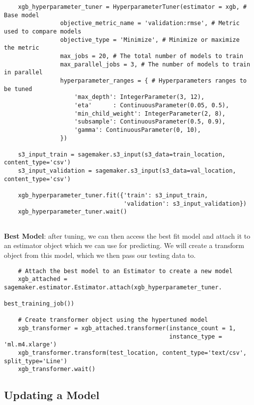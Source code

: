 \documentclass[11pt, a4paper]{article}
\begin{document}
\begin{spacing}{1.1}
\begin{lstlisting}
	xgb_hyperparameter_tuner = HyperparameterTuner(estimator = xgb, # Base model
				objective_metric_name = 'validation:rmse', # Metric used to compare models
				objective_type = 'Minimize', # Minimize or maximize the metric
				max_jobs = 20, # The total number of models to train
				max_parallel_jobs = 3, # The number of models to train in parallel
				hyperparameter_ranges = { # Hyperparameters ranges to be tuned
					'max_depth': IntegerParameter(3, 12),
					'eta'      : ContinuousParameter(0.05, 0.5),
					'min_child_weight': IntegerParameter(2, 8),
					'subsample': ContinuousParameter(0.5, 0.9),
					'gamma': ContinuousParameter(0, 10),
				})
	
	s3_input_train = sagemaker.s3_input(s3_data=train_location, content_type='csv')
	s3_input_validation = sagemaker.s3_input(s3_data=val_location, content_type='csv')
	
	xgb_hyperparameter_tuner.fit({'train': s3_input_train, 
		                          'validation': s3_input_validation})
	xgb_hyperparameter_tuner.wait()
	
	\end{lstlisting}\vspace*{2mm}
	\textbf{Best Model}: after tuning, we can then access the best fit model and attach it to an estimator object which we can use for predicting. We will create a transform object from this model, which we then pass our testing data to.
	\begin{lstlisting}
	# Attach the best model to an Estimator to create a new model
	xgb_attached = sagemaker.estimator.Estimator.attach(xgb_hyperparameter_tuner.
	                                                    best_training_job())
	
	# Create transformer object using the hypertuned model
	xgb_transformer = xgb_attached.transformer(instance_count = 1, 
	                                           instance_type = 'ml.m4.xlarge')
	xgb_transformer.transform(test_location, content_type='text/csv', split_type='Line')
	xgb_transformer.wait()
	\end{lstlisting} \newpage

	\subsection{Updating a Model}

\end{spacing}
\end{document}

